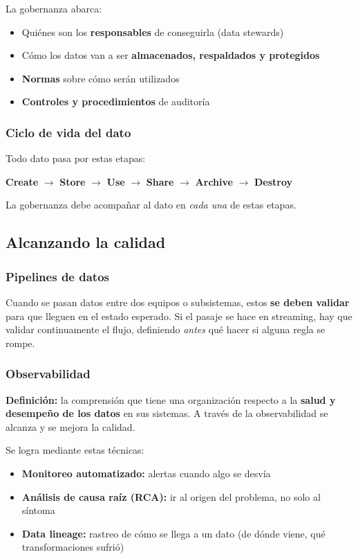 \documentclass[11pt, a4paper]{article}
\begin{document}
La gobernanza abarca:
\begin{itemize}
	\item Quiénes son los \textbf{responsables} de conseguirla (data stewards)
	\item Cómo los datos van a ser \textbf{almacenados, respaldados y protegidos}
	\item \textbf{Normas} sobre cómo serán utilizados
	\item \textbf{Controles y procedimientos} de auditoría
\end{itemize}

\subsubsection{Ciclo de vida del dato}

Todo dato pasa por estas etapas:

\begin{center}
	\textbf{Create} $\to$ \textbf{Store} $\to$ \textbf{Use} $\to$ \textbf{Share} $\to$ \textbf{Archive} $\to$ \textbf{Destroy}
\end{center}

La gobernanza debe acompañar al dato en \textit{cada una} de estas etapas.

\subsection{Alcanzando la calidad}

\subsubsection{Pipelines de datos}
Cuando se pasan datos entre dos equipos o subsistemas, estos \textbf{se deben validar} para que lleguen en el estado esperado. Si el pasaje se hace en streaming, hay que validar continuamente el flujo, definiendo \textit{antes} qué hacer si alguna regla se rompe.

\subsubsection{Observabilidad}
\textbf{Definición:} la comprensión que tiene una organización respecto a la \textbf{salud y desempeño de los datos} en sus sistemas. A través de la observabilidad se alcanza y se mejora la calidad.

Se logra mediante estas técnicas:
\begin{itemize}
	\item \textbf{Monitoreo automatizado:} alertas cuando algo se desvía
	\item \textbf{Análisis de causa raíz (RCA):} ir al origen del problema, no solo al síntoma
	\item \textbf{Data lineage:} rastreo de cómo se llega a un dato (de dónde viene, qué transformaciones sufrió)
\end{itemize}
\end{document}
